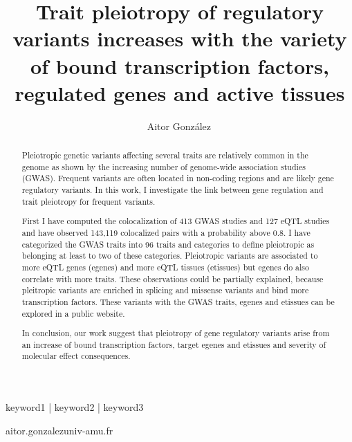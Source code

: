 
\title{Trait pleiotropy of regulatory variants increases with the variety of bound transcription factors, regulated genes and active tissues}

\author[1,*]{Aitor González\,}

\date{}

\maketitle

\begin{abstract}

Pleiotropic genetic variants affecting several traits are relatively common in the genome as shown by the increasing number of genome-wide association studies (GWAS).
%
Frequent variants are often located in non-coding regions and are likely gene regulatory variants.
%
In this work, I investigate the link between gene regulation and trait pleiotropy for frequent variants.

First I have computed the colocalization of 413 GWAS studies and 127 eQTL studies and have observed 143,119 colocalized pairs with a probability above 0.8.
%
I have categorized the GWAS traits into 96 traits and categories to define pleiotropic as belonging at least to two of these categories.
%
Pleiotropic variants are associated to more eQTL genes (egenes) and more eQTL tissues (etissues) but egenes do also correlate with more traits.
%
These observations could be partially explained, because pleitropic variants are enriched in splicing and missense variants and bind more transcription factors.
%
These variants with the GWAS traits, egenes and etissues can be explored in a public website.

In conclusion, our work suggest that pleiotropy of gene regulatory variants arise from an increase of bound transcription factors, target egenes and etissues and severity of molecular effect consequences.

\end{abstract}

\begin{keywords}
keyword1 | keyword2 | keyword3
\end{keywords}

\begin{corrauthor}
aitor.gonzalez\at univ-amu.fr
\end{corrauthor}

